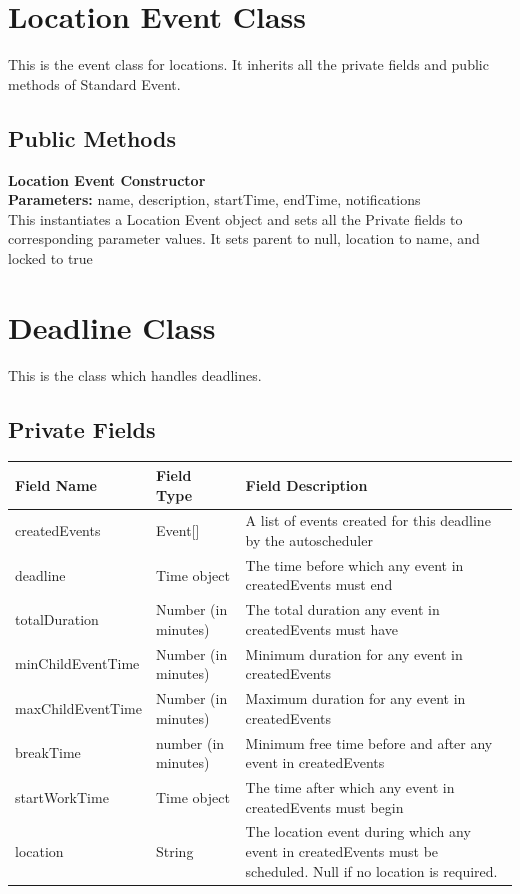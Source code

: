 \documentclass{scrreprt}
\begin{document}
\section{Location Event Class}

This is the event class for locations. It inherits all the private fields and public methods of Standard Event.

\subsection{Public Methods}

\textbf{Location Event Constructor} \\
\textbf{Parameters:} name, description, startTime, endTime, notifications \\
This instantiates a Location Event object and sets all the Private fields to corresponding parameter values. It sets parent to null, location to name, and locked to true

\section{Deadline Class}

This is the class which handles deadlines.

\subsection{Private Fields}

\begin{center}
\begin{longtable}{ | p{4cm} | p{5cm} | p{6cm} | }
\hline
\textbf{Field Name} & \textbf{Field Type} & \textbf{Field Description} \\
\hline
createdEvents & Event[] & A list of events created for this deadline by the autoscheduler \\
\hline
deadline & Time object & The time before which any event in createdEvents must end \\
\hline
totalDuration & Number (in minutes) & The total duration any event in createdEvents must have \\
\hline
minChildEventTime & Number (in minutes) & Minimum duration for any event in createdEvents \\
\hline
maxChildEventTime & Number (in minutes) & Maximum duration for any event in createdEvents \\
\hline
breakTime & number (in minutes) & Minimum free time before and after any event in createdEvents \\
\hline
startWorkTime & Time object & The time after which any event in createdEvents must begin \\
\hline
location & String & The location event during which any event in createdEvents must be scheduled. Null if no location is required. \\
\hline
\end{longtable}
\end{center}
\end{document}
